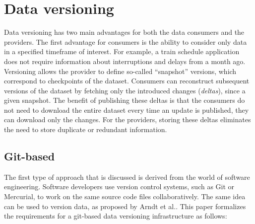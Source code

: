 \section{Data versioning}\label{sec:versioning}
Data versioning has two main advantages for both the data consumers and the providers. The first advantage for consumers is the ability to consider only data in a specified timeframe of interest. For example, a train schedule application does not require information about interruptions and delays from a month ago. Versioning allows the provider to define so-called ``snapshot'' versions, which correspond to checkpoints of the dataset. Consumers can reconstruct subsequent versions of the dataset by fetching only the introduced changes (\emph{deltas}), since a given snapshot. The benefit of publishing these deltas is that the consumers do not need to download the entire dataset every time an update is published, they can download only the changes. For the providers, storing these deltas eliminates the need to store duplicate or redundant information.

\subsection{Git-based}
The first type of approach that is discussed is derived from the world of software engineering. Software developers use version control systems, such as Git or Mercurial, to work on the same source code files collaboratively. The same idea can be used to version data, as proposed by Arndt et al.\cite{arndt2018}. This paper formalizes the requirements for a git-based data versioning infrastructure as follows:

